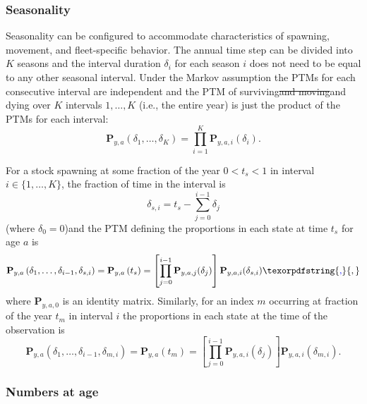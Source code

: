 \documentclass[
]{article}
\makeatletter
\providecommand{\DIFaddtex}[1]{{\protect\color{blue}\uwave{#1}}} %
\providecommand{\DIFdeltex}[1]{{\protect\color{red}\sout{#1}}} %
\providecommand{\DIFaddbegin}{} %
\providecommand{\DIFaddend}{} %
\providecommand{\DIFdelbegin}{} %
\providecommand{\DIFdelend}{} %
\providecommand{\DIFadd}[1]{\texorpdfstring{\DIFaddtex{#1}}{#1}} %
\providecommand{\DIFdel}[1]{\texorpdfstring{\DIFdeltex{#1}}{}} %
\newcommand{\DIFscaledelfig}{0.5}
\newlength{\DIFdelgraphicswidth} %
\newlength{\DIFdelgraphicsheight} %
\newcommand{\DIFaddincludegraphics}[2][]{{\color{blue}\fbox{\DIFOincludegraphics[#1]{#2}}}} %
\newcommand{\DIFdelincludegraphics}[2][]{%
\sbox{\DIFdelgraphicsbox}{\DIFOincludegraphics[#1]{#2}}%
\settoboxwidth{\DIFdelgraphicswidth}{\DIFdelgraphicsbox} %
\settoboxtotalheight{\DIFdelgraphicsheight}{\DIFdelgraphicsbox} %
\scalebox{\DIFscaledelfig}{%
\parbox[b]{\DIFdelgraphicswidth}{\usebox{\DIFdelgraphicsbox}\\[-\baselineskip] \rule{\DIFdelgraphicswidth}{0em}}\llap{\resizebox{\DIFdelgraphicswidth}{\DIFdelgraphicsheight}{%
\setlength{\unitlength}{\DIFdelgraphicswidth}%
\begin{picture}(1,1)%
\thicklines\linethickness{2pt} %
{\color[rgb]{1,0,0}\put(0,0){\framebox(1,1){}}}%
{\color[rgb]{1,0,0}\put(0,0){\line( 1,1){1}}}%
{\color[rgb]{1,0,0}\put(0,1){\line(1,-1){1}}}%
\end{picture}%
}\hspace*{3pt}}} %
} %
\DeclareRobustCommand{\DIFaddbegin}{\DIFOaddbegin \let\includegraphics\DIFaddincludegraphics} %
\DeclareRobustCommand{\DIFaddend}{\DIFOaddend \let\includegraphics\DIFOincludegraphics} %
\DeclareRobustCommand{\DIFdelbegin}{\DIFOdelbegin \let\includegraphics\DIFdelincludegraphics} %
\DeclareRobustCommand{\DIFdelend}{\DIFOaddend \let\includegraphics\DIFOincludegraphics} %
\let\sout@orig\sout %
\renewcommand{\sout}[1]{\ifmmode\text{\sout@orig{\ensuremath{#1}}}\else\sout@orig{#1}\fi} %
\makeatother
\begin{document}
\hypertarget{seasonality}{%
\subsubsection*{Seasonality}\label{seasonality}}

Seasonality can be configured to accommodate characteristics of spawning, movement, and fleet-specific behavior. The annual time step can be divided into \(K\) seasons and the interval duration \(\delta_i\) for each season \(i\) does not need to be equal to any other seasonal interval. Under the Markov assumption the PTMs for each consecutive interval are independent and the PTM of surviving\DIFdelbegin \DIFdel{and moving}\DIFdelend \DIFaddbegin \DIFadd{, moving, }\DIFaddend and dying over \(K\) intervals \(1,\ldots, K\) (i.e., the entire year) is just the product of the PTMs for each interval:
\[ \mathbf{P}_{y,a}(\delta_1,\ldots,\delta_K) = \prod^K_{i=1}\mathbf{P}_{y,a,i}(\delta_i).\]

For a stock spawning at some fraction of the year \(0<t_s<1\) in interval \(i \in \{1,\ldots,K\}\), the fraction of time in the interval is
\[\delta_{s,i} = t_s-\sum^{i-1}_{j=0}\delta_j\]
(where \(\delta_0 = 0\))\DIFaddbegin \DIFadd{, }\DIFaddend and the PTM defining the proportions in each state at time \(t_s\) for age \(a\) is
\begin{equation}\label{eq:ptm_spawn}
\mathbf{P}_{y,a}\left(\delta_1,\ldots,\delta_{i-1}, \delta_{s,i}\right) = \mathbf{P}_{y,a}\left(t_s\right) =  \left[\prod^{i-1}_{j=0}\mathbf{P}_{y,a,j}(\delta_j)\right]\mathbf{P}_{y,a,i}(\delta_{s,i})\DIFaddbegin \DIFadd{,
}\DIFaddend \end{equation}
where \(\mathbf{P}_{y,a,0}\) is an identity matrix. Similarly, for an index \(m\) occurring at fraction of the year \(t_m\) in interval \(i\) the proportions in each state at the time of the observation is
\begin{equation} \label{eq:ptm_index} 
\mathbf{P}_{y,a}\left(\delta_1,\ldots,\delta_{i-1}, \delta_{m,i}\right) = \mathbf{P}_{y,a}\left(t_m\right) =   \left[\prod^{i-1}_{j=0}\mathbf{P}_{y,a,i}(\delta_j)\right]\mathbf{P}_{y,a,i}(\delta_{m,i}).
\end{equation}

\hypertarget{numbers-at-age}{%
\subsubsection*{Numbers at age}\label{numbers-at-age}}
\end{document}
